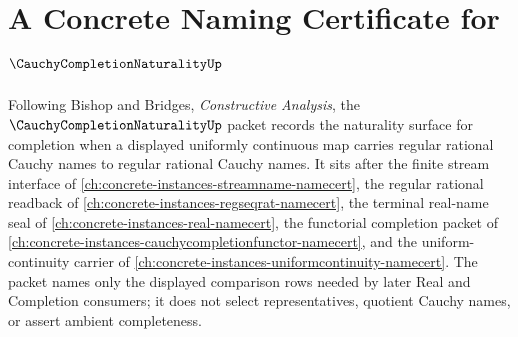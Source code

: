 \chapter{A Concrete Naming Certificate for $\CauchyCompletionNaturalityUp$}
\label{ch:concrete-instances-cauchy-completion-naturality-namecert}

Following Bishop and Bridges, \emph{Constructive Analysis}, the $\CauchyCompletionNaturalityUp$ packet records the naturality surface for completion when a displayed uniformly continuous map carries regular rational Cauchy names to regular rational Cauchy names. It sits after the finite stream interface of \autoref{ch:concrete-instances-streamname-namecert}, the regular rational readback of \autoref{ch:concrete-instances-regseqrat-namecert}, the terminal real-name seal of \autoref{ch:concrete-instances-real-namecert}, the functorial completion packet of \autoref{ch:concrete-instances-cauchycompletionfunctor-namecert}, and the uniform-continuity carrier of \autoref{ch:concrete-instances-uniformcontinuity-namecert}. The packet names only the displayed comparison rows needed by later Real and Completion consumers; it does not select representatives, quotient Cauchy names, or assert ambient completeness.

